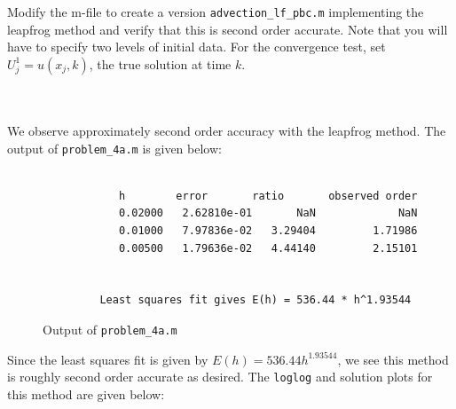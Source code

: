 Modify the m-file to create a version \texttt{advection\_lf\_pbc.m} implementing the leapfrog method and verify that 
this is second order accurate. Note that you will have to specify two levels of initial data. For the convergence test,
set $U_j^1 = u(x_j, k)$, the true solution at time $k$.

\begin{solution}\ \\\\
    We observe approximately second order accuracy with the leapfrog method. The output of \texttt{problem\_4a.m} is
    given below: \ \\\\

    \begin{figure}[h]
        \begin{verbatim}
            h        error       ratio       observed order
            0.02000   2.62810e-01       NaN             NaN
            0.01000   7.97836e-02   3.29404         1.71986
            0.00500   1.79636e-02   4.44140         2.15101
          
          
         Least squares fit gives E(h) = 536.44 * h^1.93544
        \end{verbatim}
        \caption{Output of \texttt{problem\_4a.m}}
    \end{figure}

    Since the least squares fit is given by $E(h) = 536.44 h^{1.93544}$, we see this method is roughly second order 
    accurate as desired. The \texttt{loglog} and solution plots for this method are given below:


\end{solution}
